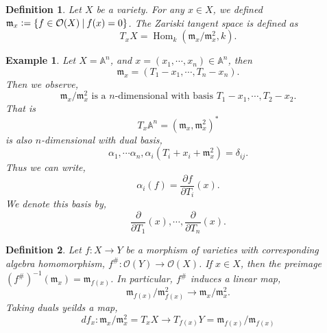 \documentclass[10pt]{article}
\newtheorem{definition}{Definition}[section]
\newtheorem{example}{Example}[section]
\numberwithin{equation}{theorem}
\DeclareMathOperator{\Hom}{Hom}
\newcommand{\defeq}{\vcentcolon=}
\newcommand{\m}[0]{\mathfrak{m}}
\newcommand{\Ouv}[0]{\mathcal{O}}
\newcommand{\A}[0]{\mathbb{A}}
\newcommand{\sep}[0]{\:|\:}
\begin{document}
\begin{definition}
  \label{definition_5_4}
  Let $X$ be a variety. For any $x\in X$, we defined $\mathfrak{m}_x \defeq \{f\in\Ouv(X)\sep f(x)=0\}$. The Zariski tangent space is defined as 
  \begin{equation*}
    T_xX = \Hom_k(\m_x/\m_x^2,k).
  \end{equation*}
\end{definition}

\begin{example}
  \label{example_5_5}
  Let $X=\A^n$, and $x=(x_1,\cdots,x_n)\in\A^n$, then 
  \begin{equation*}
    \m_x = (T_1-x_1,\cdots,T_n-x_n).
  \end{equation*}
  Then we observe,
  \begin{equation*}
    \m_x/\m_x^2\text{ is a $n$-dimensional with basis } T_1-x_1,\cdots,T_2-x_2.
  \end{equation*}
  That is 
  \begin{equation*}
    T_x\A^n = (\m_x,\m_x^2)^*
  \end{equation*}
  is also $n$-dimensional with dual basis, 
  \begin{equation*}
    \alpha_1,\cdots\alpha_n, \alpha_i(T_i+x_i+\m_x^2) = \delta_{ij}.
  \end{equation*}
  Thus we can write,
  \begin{equation*}
    \alpha_i(f) = {\frac {\partial f} {\partial T_i}}(x).
  \end{equation*}
  We denote this basis by,
  \begin{equation*}
    {\frac {\partial} {\partial T_1}}(x),\cdots,{\frac {\partial} {\partial T_n}}(x).
  \end{equation*}
\end{example}

\begin{definition}
  Let $f:X\to Y$ be a morphism of varieties with corresponding algebra homomorphism, $f^\#:\Ouv(Y)\to\Ouv(X)$. If $x\in X$, then the preimage $(f^\#)^{-1}(\m_x) = \m_{f(x)}$. In particular, $f^\#$ induces a linear map,
  \begin{equation*}
    \m_{f(x)}/\m_{f(x)}^2\to\m_x/\m_x^2.
  \end{equation*}
  Taking duals yeilds a map,
  \begin{equation*}
    df_x:\m_x/\m_x^2=T_xX\to T_{f(x)}Y=\m_{f(x)}/\m_{f(x)}
  \end{equation*}
\end{definition}
\end{document}
